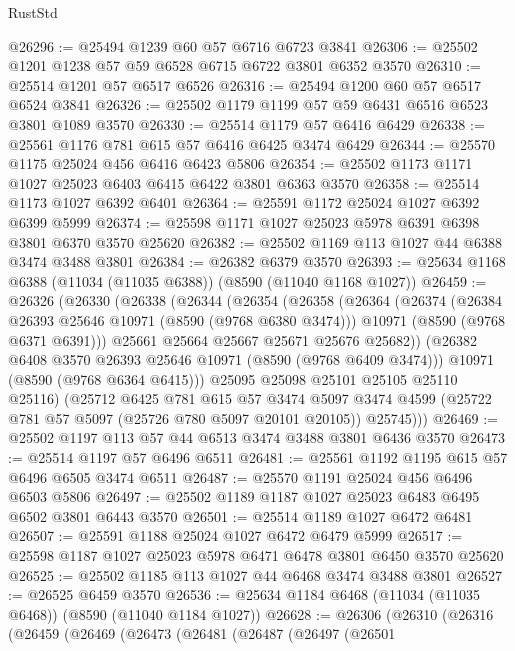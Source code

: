 \begin{lexlean}{RustStd}
\begin{coremodule}
@26296 := @25494 @1239 @60 @57 @6716 @6723 @3841
@26306 := @25502 @1201 @1238 @57 @59 @6528 @6715 @6722 @3801 @6352 @3570
@26310 := @25514 @1201 @57 @6517 @6526
@26316 := @25494 @1200 @60 @57 @6517 @6524 @3841
@26326 := @25502 @1179 @1199 @57 @59 @6431 @6516 @6523 @3801 @1089 @3570
@26330 := @25514 @1179 @57 @6416 @6429
@26338 := @25561 @1176 @781 @615 @57 @6416 @6425 @3474 @6429
@26344 := @25570 @1175 @25024 @456 @6416 @6423 @5806
@26354 := @25502 @1173 @1171 @1027 @25023 @6403 @6415 @6422 @3801 @6363 @3570
@26358 := @25514 @1173 @1027 @6392 @6401
@26364 := @25591 @1172 @25024 @1027 @6392 @6399 @5999
@26374 := @25598 @1171 @1027 @25023 @5978 @6391 @6398 @3801 @6370 @3570 @25620
@26382 := @25502 @1169 @113 @1027 @44 @6388 @3474 @3488 @3801
@26384 := @26382 @6379 @3570
@26393 := @25634 @1168 @6388 (@11034 (@11035 @6388)) (@8590 (@11040 @1168 @1027))
@26459 := @26326
    (@26330
      (@26338
        (@26344
          (@26354
            (@26358
              (@26364
                (@26374
                  (@26384 @26393 @25646 @10971 (@8590 (@9768 @6380 @3474)))
                  @10971
                  (@8590 (@9768 @6371 @6391)))
                @25661
                @25664
                @25667
                @25671
                @25676
                @25682))
            (@26382 @6408 @3570 @26393 @25646 @10971 (@8590 (@9768 @6409 @3474)))
            @10971
            (@8590 (@9768 @6364 @6415)))
          @25095
          @25098
          @25101
          @25105
          @25110
          @25116)
        (@25712
          @6425
          @781
          @615
          @57
          @3474
          @5097
          @3474
          @4599
          (@25722 @781 @57 @5097 (@25726 @780 @5097 @20101 @20105))
          @25745)))
@26469 := @25502 @1197 @113 @57 @44 @6513 @3474 @3488 @3801 @6436 @3570
@26473 := @25514 @1197 @57 @6496 @6511
@26481 := @25561 @1192 @1195 @615 @57 @6496 @6505 @3474 @6511
@26487 := @25570 @1191 @25024 @456 @6496 @6503 @5806
@26497 := @25502 @1189 @1187 @1027 @25023 @6483 @6495 @6502 @3801 @6443 @3570
@26501 := @25514 @1189 @1027 @6472 @6481
@26507 := @25591 @1188 @25024 @1027 @6472 @6479 @5999
@26517 := @25598 @1187 @1027 @25023 @5978 @6471 @6478 @3801 @6450 @3570 @25620
@26525 := @25502 @1185 @113 @1027 @44 @6468 @3474 @3488 @3801
@26527 := @26525 @6459 @3570
@26536 := @25634 @1184 @6468 (@11034 (@11035 @6468)) (@8590 (@11040 @1184 @1027))
@26628 := @26306
    (@26310
      (@26316
        (@26459
          (@26469
            (@26473
              (@26481
                (@26487
                  (@26497
                    (@26501

\end{coremodule}
\end{lexlean}
